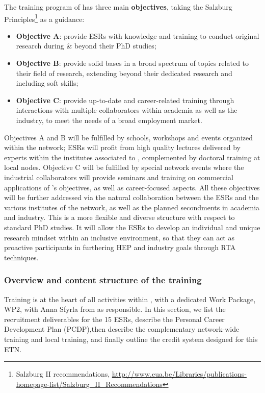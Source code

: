 The training program of \acronym has three main {\bf objectives}, taking the Salzburg Principles\footnote{Salzburg II recommendations, \url{http://www.eua.be/Libraries/publications-homepage-list/Salzburg_II_Recommendations}} as a guidance: 
\begin{itemize}
\item {\bf Objective A}: provide ESRs with knowledge and training to conduct original research during \& beyond their PhD studies;
\item {\bf Objective B}: provide solid bases in a broad spectrum of topics related to their field of research, extending beyond their dedicated research and including soft skills; 
\item {\bf Objective C}: provide up-to-date and career-related training through interactions with multiple collaborators within academia as well as the industry, to meet the needs of a broad employment market.
\end{itemize}

Objectives A and B will be fulfilled by schools, workshops and events organized within the network; ESRs will profit from high quality lectures delivered by experts within the institutes associated to \acronym, complemented by doctoral training at local nodes. Objective C will be fulfilled by special network events where the industrial collaborators will provide seminars and training on commercial applications of \acronym's objectives, as well as career-focused aspects. All these objectives will be further addressed via the natural collaboration between the ESRs and the various institutes of the network, as well as the planned secondments in academia and industry. This is a more flexible and diverse structure with respect to standard PhD studies. It will allow the ESRs to develop an individual and unique research mindset within an inclusive environment, so that they can act as proactive participants in furthering HEP and industry goals through RTA techniques.

\vspace{-2mm}
\subsubsection{Overview and content structure of the training}
\label{sub:overviewTraining}

Training is at the heart of all activities within \acronym, with a dedicated Work Package, WP2, with Anna Sfyrla from \unigeentity as responsible. 
In this section, we list the recruitment deliverables for the 15 ESRs, describe the Personal Career Development Plan (PCDP),then describe the complementary network-wide training and local training, and finally outline the \acronym credit system designed for this ETN. 

